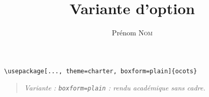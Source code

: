 \documentclass[11pt]{ocots-book}
\title{Variante d'option}
\author{Prénom \textsc{Nom}}
\newcommand{\ocotsvariantnote}[1]{\begin{quote}\itshape Variante : #1\end{quote}}
\begin{document}
\maketitle
\begin{lstlisting}
\usepackage[..., theme=charter, boxform=plain]{ocots}
\end{lstlisting}
\ocotsvariantnote{\texttt{boxform=plain} : rendu académique sans cadre.}

\end{document}
